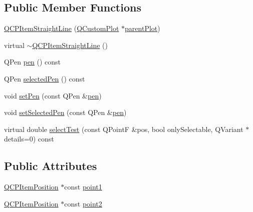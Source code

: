 \subsection*{Public Member Functions}
\begin{DoxyCompactItemize}
\item 
\hyperlink{classQCPItemStraightLine_a41fd2e1f006983449eca9830930c3b10}{Q\+C\+P\+Item\+Straight\+Line} (\hyperlink{classQCustomPlot}{Q\+Custom\+Plot} $\ast$\hyperlink{classQCPLayerable_ab7e0e94461566093d36ffc0f5312b109}{parent\+Plot})
\item 
virtual \hyperlink{classQCPItemStraightLine_a1f0730759916ce203baeaad1ad2af3ea}{$\sim$\+Q\+C\+P\+Item\+Straight\+Line} ()
\item 
Q\+Pen \hyperlink{classQCPItemStraightLine_ad858ab1a444391aab778f765453ea222}{pen} () const 
\item 
Q\+Pen \hyperlink{classQCPItemStraightLine_a9e33ae966a7e2ea1083b3b9aeabeaea5}{selected\+Pen} () const 
\item 
void \hyperlink{classQCPItemStraightLine_a9f36c9c9e60d7d9ac084c80380ac8601}{set\+Pen} (const Q\+Pen \&\hyperlink{classQCPItemStraightLine_ad858ab1a444391aab778f765453ea222}{pen})
\item 
void \hyperlink{classQCPItemStraightLine_a5c33559498d33543fa95cf0a36e851ff}{set\+Selected\+Pen} (const Q\+Pen \&\hyperlink{classQCPItemStraightLine_ad858ab1a444391aab778f765453ea222}{pen})
\item 
virtual double \hyperlink{classQCPItemStraightLine_a64cc3796f58ce856012732603edb2f1c}{select\+Test} (const Q\+PointF \&pos, bool only\+Selectable, Q\+Variant $\ast$details=0) const 
\end{DoxyCompactItemize}
\subsection*{Public Attributes}
\begin{DoxyCompactItemize}
\item 
\hyperlink{classQCPItemPosition}{Q\+C\+P\+Item\+Position} $\ast$const \hyperlink{classQCPItemStraightLine_ac131a6ffe456f2cc7364dce541fe0120}{point1}
\item 
\hyperlink{classQCPItemPosition}{Q\+C\+P\+Item\+Position} $\ast$const \hyperlink{classQCPItemStraightLine_ad26c0a732e471f63f75d481dcd48cfc9}{point2}
\end{DoxyCompactItemize}

